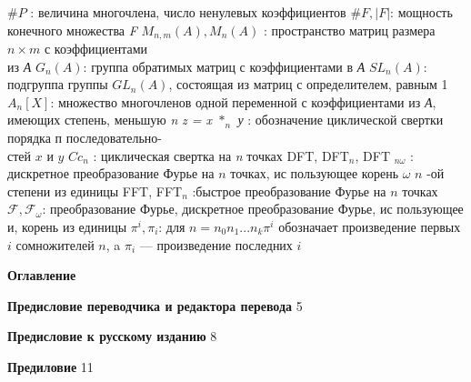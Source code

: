 \documentclass{mai_book}
\begin{document}
{  $\#P$ : величина многочлена, число ненулевых коэффициентов \newline
  $\#F, |F|$: мощность конечного множества \emph{F} \newline
  $M_{n, m}(A), M_{n}(A)$ : пространство матриц размера $n \times m$ с коэффициентами
\\ из \emph{А} \newline
$G_{n}(A)$: группа обратимых матриц с коэффициентами в \emph{А} \newline
$SL_{n}(A)$: подгруппа группы $GL_{n}(A)$, состоящая из матриц с определителем, равным 1 \newline
$A_{n}[X]$: множество многочленов одной переменной с коэффициентами из \emph{А}, имеющих степень, меньшую \emph{n} \newline
{\itshape z = x $*_{n} $ у} : обозначение циклической свертки порядка п последовательно- \\стей $x$ и $y$ \newline
$Cc_{n}$ : циклическая свертка на \emph{n} точках \newline
D\small{FT}, D\small{FT}$_{n}$, D\small{FT} $_{n\omega}$ : дискретное преобразование Фурье на $n$ точках, ис­
пользующее корень $\omega$ $n$ -ой степени из единицы \newline
F\small{FT}, F\small{FT}$_{n}$ :быстрое преобразование Фурье на $n$ точках \newline
$\mathcal{F}, \mathcal{F}_{\omega}$: преобразование Фурье, дискретное преобразование Фурье, ис­ пользующее и, корень из единицы \newline
$\pi^{i}, \pi_{i}$: для $n = n_{0}n_{1} . . . n_{k} \pi^{i}$ обозначает произведение первых $i$ сомножителей $n$, a $\pi_{i}$ --- произведение последних $i$

\newpage

\thispagestyle{empty}
\hfill \break
\hfill \break
\hfill \break
\hfill \break
\hfill \break
\hfill \break
\hfill \break
\begin{center}
	{\Large\textbf{ Оглавление}}
\end{center}
\hfill \break
\hfill \break

\noindent \textbf{Предисловие переводчика и редактора перевода} \dotfill \hspace{0.5cm} 5

\noindent \textbf{Предисловие к русскому изданию} \dotfill \hspace{0.5cm} 8

\noindent \textbf{Предиловие} \dotfill \hspace{0.5cm} 11

}
\end{document}
